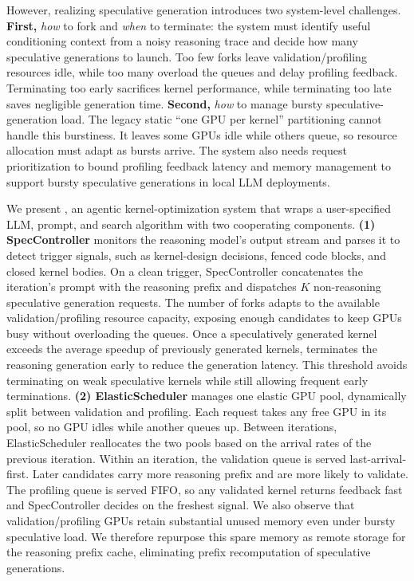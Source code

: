 However, realizing speculative generation introduces two system-level challenges.
\textbf{First,} \emph{how} to fork and \emph{when} to terminate:
the system must identify useful conditioning context from a noisy reasoning
trace and decide how many speculative generations to launch.
Too few forks leave validation/profiling resources idle, while too many overload
the queues and delay profiling feedback.
Terminating too early sacrifices kernel performance, while terminating too late saves negligible generation time.
\textbf{Second,} \emph{how} to manage bursty speculative-generation load.
The legacy static ``one GPU per kernel'' partitioning cannot handle this burstiness.
It leaves some GPUs idle while others queue, so resource allocation must adapt as bursts arrive.
The system also needs request prioritization to bound profiling feedback latency
and memory management to support bursty speculative generations in local LLM
deployments.

We present \sysname{}, an agentic kernel-optimization system that wraps a user-specified LLM, prompt, and search algorithm with two cooperating components.
\textbf{(1) SpecController} monitors the reasoning model's output stream and parses it to detect trigger signals, such as kernel-design decisions, fenced code blocks, and closed kernel bodies.
On a clean trigger, SpecController concatenates the iteration's prompt with the reasoning prefix and dispatches $K$ non-reasoning speculative generation requests.
The number of forks adapts to the available validation/profiling resource capacity, exposing enough candidates to keep GPUs busy without overloading the queues.
Once a speculatively generated kernel exceeds the average speedup of previously generated kernels, \sysname{} terminates the reasoning generation early to reduce the generation latency.
This threshold avoids terminating on weak speculative kernels while still allowing frequent early terminations.
\textbf{(2) ElasticScheduler} manages one elastic GPU pool, dynamically split between validation and profiling.
Each request takes any free GPU in its pool, so no GPU idles while another queues up.
Between iterations, ElasticScheduler reallocates the two pools based on the arrival rates of the previous iteration.
Within an iteration, the validation queue is served last-arrival-first.
Later candidates carry more reasoning prefix and are more likely to validate.
The profiling queue is served FIFO, so any validated kernel returns feedback fast and SpecController decides on the freshest signal.
We also observe that validation/profiling GPUs retain substantial unused memory
even under bursty speculative load.
We therefore repurpose this spare memory as remote storage for the
reasoning prefix cache, eliminating prefix recomputation of speculative generations.

